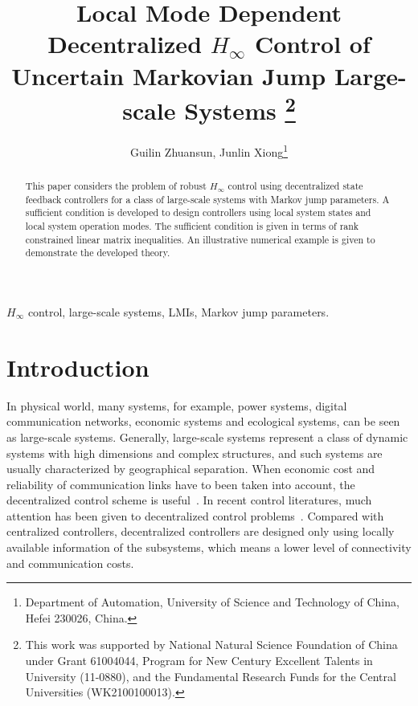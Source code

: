 \documentclass[11pt,draftcls,onecolumn]{IEEEtran}
\begin{document}
\title{Local Mode Dependent Decentralized $H_{\infty}$ Control of Uncertain Markovian Jump Large-scale Systems \thanks{This work was supported by National Natural Science Foundation
    of China under Grant 61004044, Program for New Century Excellent Talents
    in University (11-0880), and the Fundamental Research Funds for the
    Central Universities (WK2100100013).}
}
\author{Guilin Zhuansun, Junlin Xiong\thanks{Department of Automation, University of Science and Technology of
    China, Hefei 230026, China.}}



\maketitle

\begin{abstract}
This paper considers the problem of robust $H_{\infty}$  control using decentralized state feedback controllers for a class of  large-scale systems with Markov jump parameters.  A  sufficient condition is developed to design   controllers using local system states and local system operation modes. The sufficient condition is given in terms of rank constrained linear matrix inequalities. An illustrative numerical example is given to demonstrate the developed theory.
\end{abstract}
\begin{IEEEkeywords}
$H_{\infty}$ control, large-scale systems, LMIs, Markov jump parameters.
\end{IEEEkeywords}

\section{Introduction}
In physical world, many systems, for example, power systems, digital communication networks, economic systems and ecological systems, can be seen as large-scale systems. Generally, large-scale systems represent a class of
dynamic systems with high dimensions and complex structures, and such systems are usually  characterized by geographical separation. When economic cost and reliability of  communication links have to been taken into account,
the decentralized control scheme is useful~\cite{Sandell1978}. In recent control literatures, much attention has been given to decentralized control problems~\cite{Ugrinovskii2005,Xiong2009,Ugrinovskii2000}. Compared with centralized controllers, decentralized controllers are designed only using locally available information of the subsystems, which means a lower level of connectivity and  communication costs.
\end{document}
